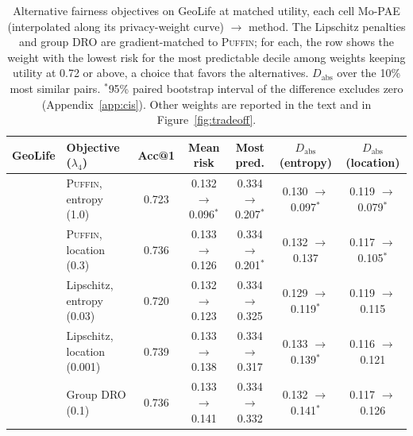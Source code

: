 \documentclass[sigconf,anonymous,review]{acmart}
\newcommand{\puffin}{\textsc{Puffin}}
\begin{document}
\begin{table}[t]
\centering
\caption{Alternative fairness objectives on GeoLife at matched utility, each cell Mo-PAE (interpolated along its privacy-weight curve) $\to$ method. The Lipschitz penalties and group DRO are gradient-matched to \puffin; for each, the row shows the weight with the lowest risk for the most predictable decile among weights keeping utility at 0.72 or above, a choice that favors the alternatives. $D_{\mathrm{abs}}$ over the 10\% most similar pairs. $^*$95\% paired bootstrap interval of the difference excludes zero (Appendix~\ref{app:cis}). Other weights are reported in the text and in Figure~\ref{fig:tradeoff}.}
\label{tab:alternatives}
\small
\begin{tabular}{@{}llccccc@{}}
\toprule
GeoLife & Objective ($\lambda_4$) & Acc@1 & Mean risk & Most pred. & $D_{\mathrm{abs}}$ (entropy) & $D_{\mathrm{abs}}$ (location) \\
\midrule
 & \puffin, entropy (1.0) & 0.723 & 0.132 $\to$ 0.096$^*$ & 0.334 $\to$ 0.207$^*$ & 0.130 $\to$ 0.097$^*$ & 0.119 $\to$ 0.079$^*$ \\
 & \puffin, location (0.3) & 0.736 & 0.133 $\to$ 0.126 & 0.334 $\to$ 0.201$^*$ & 0.132 $\to$ 0.137 & 0.117 $\to$ 0.105$^*$ \\
 & Lipschitz, entropy (0.03) & 0.720 & 0.132 $\to$ 0.123 & 0.334 $\to$ 0.325 & 0.129 $\to$ 0.119$^*$ & 0.119 $\to$ 0.115 \\
 & Lipschitz, location (0.001) & 0.739 & 0.133 $\to$ 0.138 & 0.334 $\to$ 0.317 & 0.133 $\to$ 0.139$^*$ & 0.116 $\to$ 0.121 \\
 & Group DRO (0.1) & 0.736 & 0.133 $\to$ 0.141 & 0.334 $\to$ 0.332 & 0.132 $\to$ 0.141$^*$ & 0.117 $\to$ 0.126 \\
\bottomrule
\end{tabular}
\end{table}
\end{document}

